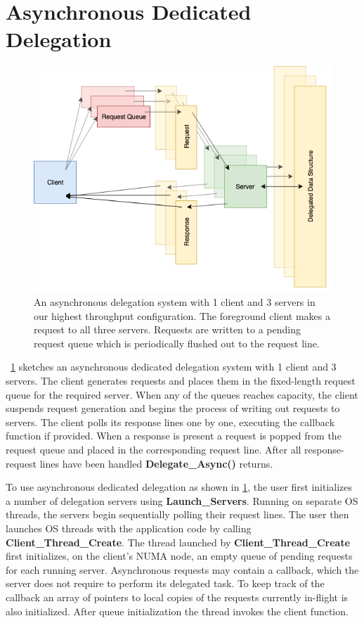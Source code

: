\documentclass{uicthesi}
\begin{document}
\section{Asynchronous Dedicated Delegation}
\begin{figure}[ht!]
\centering
\includegraphics[width=0.9\columnwidth]{FIG/dedicated_async.png}
\caption{An asynchronous delegation system with 1 client and 3 servers in our highest throughput configuration. The foreground client makes a request to all three servers. Requests are written to a pending request queue which is periodically flushed out to the request line. }
\label{fig:dedicated_delegation}
\end{figure}

~\ref{fig:dedicated_delegation} sketches an asynchronous dedicated delegation system with 1 client and 3 servers. The client generates requests and places them in the fixed-length request queue for the required server. When any of the queues reaches capacity, the client suspends request generation and begins the process of writing out requests to servers. The client polls its response lines one by one, executing the callback function if provided. When a response is present a request is popped from the request queue and placed in the corresponding request line. After all response-request lines have been handled \textbf{Delegate\_Async()} returns. 

To use asynchronous dedicated delegation as shown in \ref{fig:dedicated_delegation}, the user first initializes a number of delegation servers using \textbf{Launch\_Servers}. Running on separate OS threads, the servers begin sequentially polling their request lines. The user then launches OS threads with the application code by calling \textbf{Client\_Thread\_Create}. The thread launched by \textbf{Client\_Thread\_Create} first initializes, on the client's NUMA node, an empty queue of pending requests for each running server. Asynchronous requests may contain a callback, which the server does not require to perform its delegated task. To keep track of the callback an array of pointers to local copies of the requests currently in-flight is also initialized. After queue initialization the thread invokes the client function. 
\end{document}
